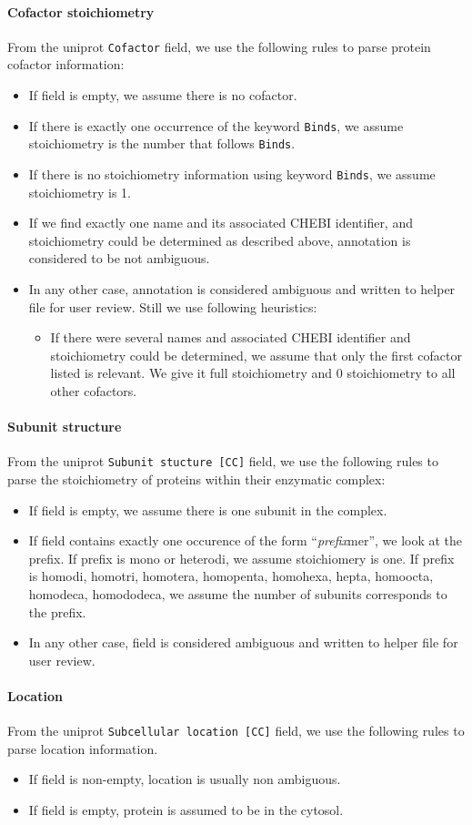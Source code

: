 \paragraph{Cofactor stoichiometry} From the uniprot \texttt{Cofactor} field, we use the following rules to parse protein cofactor information:
\begin{itemize}
\item If field is empty, we assume there is no cofactor.
\item If there is exactly one occurrence of the keyword \texttt{Binds}, we assume stoichiometry is the number that follows \texttt{Binds}.
\item If there is no stoichiometry information using keyword \texttt{Binds}, we assume stoichiometry is 1.
\item If we find exactly one name and its associated CHEBI identifier, and stoichiometry could be determined as described above, annotation is considered to be not ambiguous.
\item In any other case, annotation is considered ambiguous and written to helper file for user review. Still we use following heuristics:
  \begin{itemize}
  \item If there were several names and associated CHEBI identifier and stoichiometry could be determined, we assume that only the first cofactor listed is relevant. We give it full stoichiometry and 0 stoichiometry to all other cofactors.
  \end{itemize}
\end{itemize}

\paragraph{Subunit structure} From the uniprot \texttt{Subunit stucture [CC]} field, we use the following rules to parse the stoichiometry of proteins within their enzymatic complex:
\begin{itemize}
\item If field is empty, we assume there is one subunit in the complex.
\item If field contains exactly one occurence of the form ``\textit{prefix}mer'', we look at the prefix. If prefix is mono or heterodi, we assume stoichiomery is one. If prefix is homodi, homotri, homotera, homopenta, homohexa, hepta, homoocta, homodeca, homododeca, we assume the number of subunits corresponds to the prefix.
\item In any other case, field is considered ambiguous and written to helper file for user review. 
\end{itemize}

\paragraph{Location} From the uniprot \texttt{Subcellular location [CC]} field, we use the following rules to parse location information.
\begin{itemize}
\item If field is non-empty, location is usually non ambiguous.
\item If field is empty, protein is assumed to be in the cytosol.
\end{itemize}
